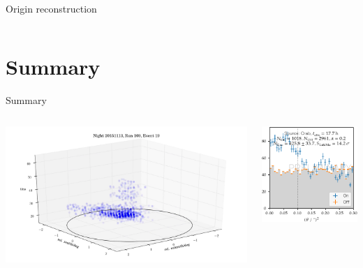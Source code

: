 \begin{frame}[t]{Origin reconstruction}
\begin{columns}[onlytextwidth]
\begin{column}{0.475\textwidth}
\end{column}
\end{columns}
\end{frame}


\section{Summary}



\begin{frame}[t]{Summary}
    \begin{columns}[onlytextwidth]
        \begin{column}{0.3\textwidth}
            \includegraphics[width=1.2\textwidth]{fig/event1.png}
        \end{column}
        \begin{column}{0.3\textwidth}
            \includegraphics[width=\textwidth]{fig/theta2_plot.pdf}

\end{column}
\end{columns}
\end{frame}

